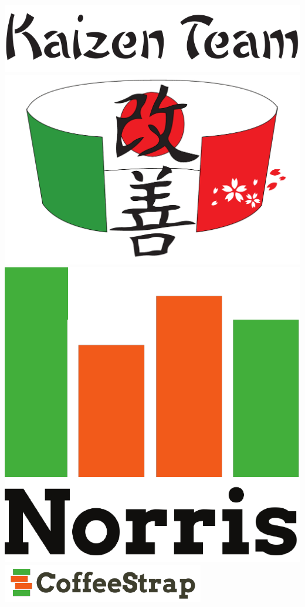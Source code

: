 \begin{titlepage}
  \begin{center}
	
	\includegraphics{Pics/KaizenTeam} \\ [1cm]
	
	\includegraphics[scale=0.6]{Pics/Logo} \\ [1cm]

	\includegraphics[scale=0.3]{Pics/Norris} \\ [0.5cm]
	\includegraphics[scale=1]{Pics/CoffeeStrap} \\ [2cm]


\end{center}
\end{titlepage}
